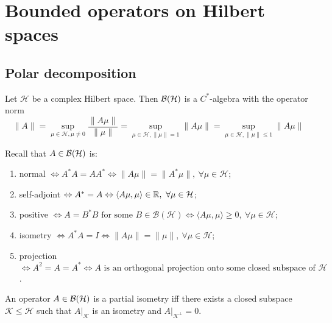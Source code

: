 \section{Bounded operators on Hilbert spaces}

\subsection{Polar decomposition}

Let $\mathcal{H}$ be a complex Hilbert space. Then $\operatorname{\mathcal{B} (\mathcal{H})}$
is a $C^*$-algebra with the operator norm 
$$\|A\| = \sup_{\mu \in \mathcal{H}, \mu \neq 0} \frac{\| A\mu\|}{\| \mu\|} = \sup_{\mu \in \mathcal{H}, \|\mu\| = 1} \|A\mu\| = \sup_{\mu \in \mathcal{H}, \|\mu\| \leq 1} \|A\mu\|$$

\begin{remark}
  Recall that $A \in \operatorname{\mathcal{B} (\mathcal{H})}$ is:
  \begin{enumerate}
    \item normal $\Leftrightarrow A^* A = A A^* \Leftrightarrow \|A\mu\| = \|A^* \mu\|,\ \forall \mu \in \mathcal{H}$;
    \item self-adjoint $\Leftrightarrow A^* = A \Leftrightarrow \langle A\mu, \mu\rangle \in \mathbb {R},\ \forall \mu \in \mathcal{H}$;
    \item positive $\Leftrightarrow \textrm{$A = B^* B$ for some $B \in \mathcal{B}(\mathcal{H})$} \Leftrightarrow \langle A\mu, \mu\rangle \geq 0,\ \forall \mu \in \mathcal{H}$;
    \item isometry $\Leftrightarrow A^* A = I \Leftrightarrow \| A\mu \| = \| \mu\|,\ \forall \mu \in \mathcal{H}$;
    \item projection $\Leftrightarrow A^2 = A = A^* \Leftrightarrow \textrm{$A$ is an orthogonal projection onto some closed subspace of $\mathcal{H}$}$.
  \end{enumerate}
\end{remark}

\begin{lemma}
  An operator $A \in \operatorname{\mathcal{B} (\mathcal{H})}$ is a partial isometry iff there exists a closed subspace $\mathcal{K} \leq \mathcal{H}$
  such that $A\big|_{\mathcal{K}}$ is an isometry and $A\big|_{\mathcal{K}^\perp} = 0$.
\end{lemma}


